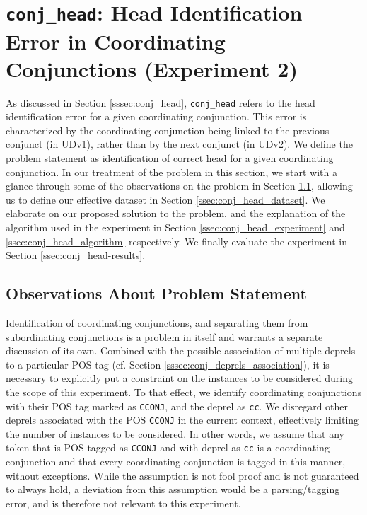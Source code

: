 \chapter{\texttt{conj\_head}: Head Identification Error in Coordinating Conjunctions (Experiment 2)}
\label{chap:conj_head}

As discussed in Section \ref{sssec:conj_head}, \texttt{conj\_head} refers to the head identification error for a given coordinating conjunction. This error is characterized by the coordinating conjunction being linked to the previous conjunct (in UDv1), rather than by the next conjunct (in UDv2). We define the problem statement as identification of correct head for a given coordinating conjunction. In our treatment of the problem in this section, we start with a glance through some of the observations on the problem in Section \ref{ssec:conj_head_observations}, allowing us to define our effective dataset in Section \ref{ssec:conj_head_dataset}. We elaborate on our proposed solution to the problem, and the explanation of the algorithm used in the experiment in Section \ref{ssec:conj_head_experiment} and \ref{ssec:conj_head_algorithm} respectively. We finally evaluate the experiment in Section \ref{ssec:conj_head-results}.

\section{Observations About Problem Statement}
\label{ssec:conj_head_observations}

Identification of coordinating conjunctions, and separating them from subordinating conjunctions is a problem in itself and warrants a separate discussion of its own. Combined with the possible association of multiple deprels to a particular POS tag (cf. Section \ref{sssec:conj_deprels_association}), it is necessary to explicitly put a constraint on the instances to be considered during the scope of this experiment. To that effect, we identify coordinating conjunctions with their POS tag marked as \verb|CCONJ|, and the deprel as \verb|cc|. We disregard other deprels associated with the POS \verb|CCONJ| in the current context, effectively limiting the number of instances to be considered. In other words, we assume that any token that is POS tagged as \verb|CCONJ| and with deprel as \verb|cc| is a coordinating conjunction and that every coordinating conjunction is tagged in this manner, without exceptions. While the assumption is not fool proof and is not guaranteed to always hold, a deviation from this assumption would be a parsing/tagging error, and is therefore not relevant to this experiment.

